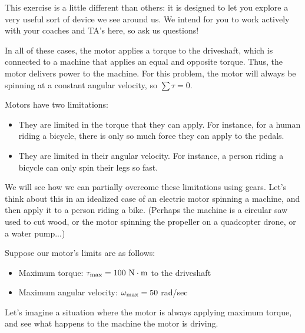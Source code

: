\documentclass[12pt]{article}
\begin{document}
This exercise is a little different than others: it is designed to let you explore a very useful sort of device we see around us. 
We intend for you to work actively with your coaches and TA's here, so ask us questions!

In all of these cases, the motor applies a torque to the driveshaft, which is connected to a machine that applies an equal and opposite torque. Thus, the motor delivers power to the machine. For this problem, the motor will always be spinning at a constant angular velocity, so $\sum \tau = 0$.

Motors have two limitations: 

\begin{itemize}
	\item They are limited in the torque that they can apply. For instance, for a human riding a bicycle, there is only so much force they can apply to the pedals.
	\item They are limited in their angular velocity. For instance, a person riding a bicycle can only spin their legs so fast.
\end{itemize}

		We will see how we can partially overcome these limitations using gears. Let's think about this in an idealized case of an electric motor spinning a machine, and then apply it to a person riding a bike. (Perhaps the machine is a circular saw used to cut wood, or the motor spinning the propeller
		on a quadcopter drone, or a water pump...)

Suppose our motor's limits are as follows:

		\begin{itemize}
			\item Maximum torque: $\tau_{\rm {max}}=100~\rm N \cdot \rm m$ to the driveshaft
			\item Maximum angular velocity: $\omega_{\rm max} = 50$ rad/sec
		\end{itemize}

Let's imagine a situation where the motor is always applying maximum torque, and see what happens to the machine the motor is driving.

\bigskip
\newpage
\end{document}
